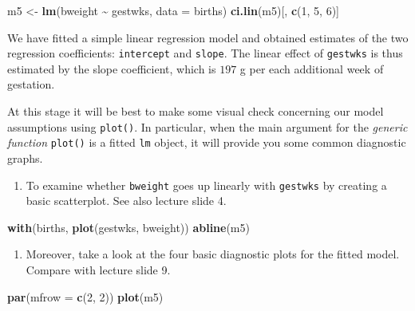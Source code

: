 \documentclass[
]{book}
\newenvironment{Shaded}{\begin{snugshade}}{\end{snugshade}}
\newcommand{\AttributeTok}[1]{\textcolor[rgb]{0.13,0.29,0.53}{#1}}
\newcommand{\DecValTok}[1]{\textcolor[rgb]{0.00,0.00,0.81}{#1}}
\newcommand{\FunctionTok}[1]{\textcolor[rgb]{0.13,0.29,0.53}{\textbf{#1}}}
\newcommand{\NormalTok}[1]{#1}
\newcommand{\OtherTok}[1]{\textcolor[rgb]{0.56,0.35,0.01}{#1}}
\newcommand{\SpecialCharTok}[1]{\textcolor[rgb]{0.81,0.36,0.00}{\textbf{#1}}}
\providecommand{\tightlist}{%
  \setlength{\itemsep}{0pt}\setlength{\parskip}{0pt}}
\begin{document}
\begin{Shaded}
\begin{Highlighting}[]
\NormalTok{m5 }\OtherTok{\textless{}{-}} \FunctionTok{lm}\NormalTok{(bweight }\SpecialCharTok{\textasciitilde{}}\NormalTok{ gestwks, }\AttributeTok{data =}\NormalTok{ births)}
\FunctionTok{ci.lin}\NormalTok{(m5)[, }\FunctionTok{c}\NormalTok{(}\DecValTok{1}\NormalTok{, }\DecValTok{5}\NormalTok{, }\DecValTok{6}\NormalTok{)]}
\end{Highlighting}
\end{Shaded}

We have fitted a simple linear regression model and
obtained estimates of the
two regression coefficients: \texttt{intercept} and \texttt{slope}.
The linear effect of \texttt{gestwks} is thus estimated by the
slope coefficient, which is \(197\) g per each additional week of gestation.

At this stage it will be best to make some visual check concerning
our model assumptions using \texttt{plot()}. In particular, when the main argument
for the \emph{generic function} \texttt{plot()} is a fitted \texttt{lm} object,
it will provide you some common diagnostic graphs.

\begin{enumerate}
\def\labelenumi{\arabic{enumi}.}
\setcounter{enumi}{1}
\tightlist
\item
  To examine whether \texttt{bweight} goes up linearly with \texttt{gestwks}
  by creating a basic scatterplot. See also lecture slide 4.
\end{enumerate}

\begin{Shaded}
\begin{Highlighting}[]
\FunctionTok{with}\NormalTok{(births, }\FunctionTok{plot}\NormalTok{(gestwks, bweight))}
\FunctionTok{abline}\NormalTok{(m5)}
\end{Highlighting}
\end{Shaded}

\begin{enumerate}
\def\labelenumi{\arabic{enumi}.}
\setcounter{enumi}{2}
\tightlist
\item
  Moreover, take a look at the four
  basic diagnostic plots for the fitted model.
  Compare with lecture slide 9.
\end{enumerate}

\begin{Shaded}
\begin{Highlighting}[]
\FunctionTok{par}\NormalTok{(}\AttributeTok{mfrow =} \FunctionTok{c}\NormalTok{(}\DecValTok{2}\NormalTok{, }\DecValTok{2}\NormalTok{))}
\FunctionTok{plot}\NormalTok{(m5)}
\end{Highlighting}
\end{Shaded}
\end{document}
